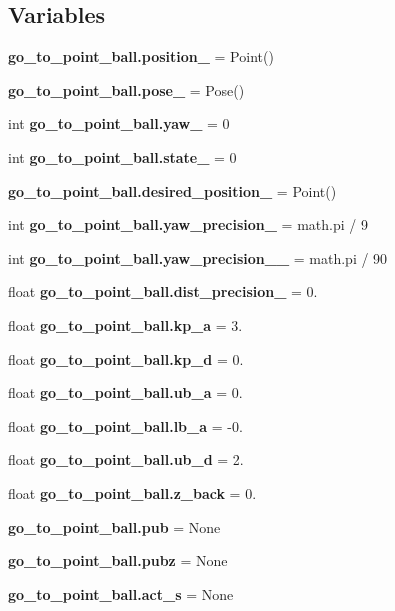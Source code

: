 \subsection*{Variables}
\begin{DoxyCompactItemize}
\item 
\textbf{ go\+\_\+to\+\_\+point\+\_\+ball.\+position\+\_\+} = Point()
\item 
\textbf{ go\+\_\+to\+\_\+point\+\_\+ball.\+pose\+\_\+} = Pose()
\item 
int \textbf{ go\+\_\+to\+\_\+point\+\_\+ball.\+yaw\+\_\+} = 0
\item 
int \textbf{ go\+\_\+to\+\_\+point\+\_\+ball.\+state\+\_\+} = 0
\item 
\textbf{ go\+\_\+to\+\_\+point\+\_\+ball.\+desired\+\_\+position\+\_\+} = Point()
\item 
int \textbf{ go\+\_\+to\+\_\+point\+\_\+ball.\+yaw\+\_\+precision\+\_\+} = math.\+pi / 9
\item 
int \textbf{ go\+\_\+to\+\_\+point\+\_\+ball.\+yaw\+\_\+precision\+\_\+\_\+} = math.\+pi / 90
\item 
float \textbf{ go\+\_\+to\+\_\+point\+\_\+ball.\+dist\+\_\+precision\+\_\+} = 0.
\item 
float \textbf{ go\+\_\+to\+\_\+point\+\_\+ball.\+kp\+\_\+a} = 3.
\item 
float \textbf{ go\+\_\+to\+\_\+point\+\_\+ball.\+kp\+\_\+d} = 0.
\item 
float \textbf{ go\+\_\+to\+\_\+point\+\_\+ball.\+ub\+\_\+a} = 0.
\item 
float \textbf{ go\+\_\+to\+\_\+point\+\_\+ball.\+lb\+\_\+a} = -\/0.
\item 
float \textbf{ go\+\_\+to\+\_\+point\+\_\+ball.\+ub\+\_\+d} = 2.
\item 
float \textbf{ go\+\_\+to\+\_\+point\+\_\+ball.\+z\+\_\+back} = 0.
\item 
\textbf{ go\+\_\+to\+\_\+point\+\_\+ball.\+pub} = None
\item 
\textbf{ go\+\_\+to\+\_\+point\+\_\+ball.\+pubz} = None
\item 
\textbf{ go\+\_\+to\+\_\+point\+\_\+ball.\+act\+\_\+s} = None
\end{DoxyCompactItemize}
